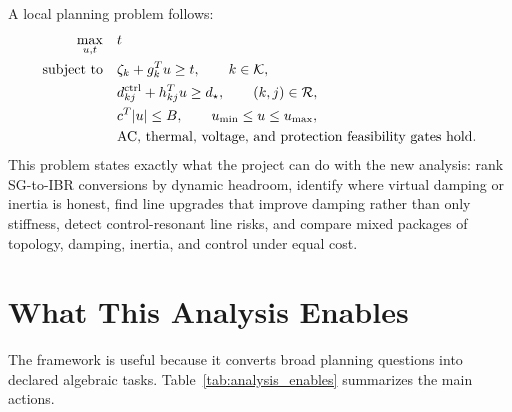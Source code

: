 A local planning problem follows:
\begin{align}
  \max_{u,t}\quad & t \label{eq:planning_problem}\\
  \text{subject to}\quad
  & \zeta_k+g_k^Tu\ge t,\qquad k\in\mathcal K, \nonumber\\
  & d^{\rm ctrl}_{kj}+h_{kj}^Tu\ge d_\star,\qquad (k,j)\in\mathcal R,
    \nonumber\\
  & c^T|u|\le B,\qquad u_{\min}\le u\le u_{\max}, \nonumber\\
  & \text{AC, thermal, voltage, and protection feasibility gates hold.}
    \nonumber
\end{align}
This problem states exactly what the project can do with the new analysis:
rank SG-to-IBR conversions by dynamic headroom, identify where virtual damping
or inertia is honest, find line upgrades that improve damping rather than only
stiffness, detect control-resonant line risks, and compare mixed packages of
topology, damping, inertia, and control under equal cost.

\section{What This Analysis Enables}

The framework is useful because it converts broad planning questions into
declared algebraic tasks. Table~\ref{tab:analysis_enables} summarizes the
main actions.

